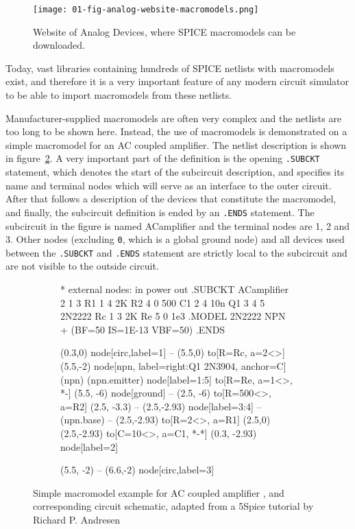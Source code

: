 \begin{figure}[h]
	\centering
	\texttt{[image: 01-fig-analog-website-macromodels.png]}
	\caption{Website of Analog Devices, where SPICE macromodels can be downloaded.}
	\label{fig:analog-macromodel-website}
\end{figure}

Today, vast libraries containing hundreds of SPICE netlists with macromodels exist, and therefore it is a very important feature of any modern circuit simulator to be able to import macromodels from these netlists.

Manufacturer-supplied macromodels are often very complex and the netlists are too long to be shown here. Instead, the use of macromodels is demonstrated on a simple macromodel for an AC coupled amplifier. The netlist description is shown in figure~\ref{fig:example_subcircuit}. A very important part of the definition is the opening \texttt{.SUBCKT} statement, which denotes the start of the subcircuit description, and specifies its name and terminal nodes which will serve as an interface to the outer circuit. After that follows a description of the devices that constitute the macromodel, and finally, the subcircuit definition is ended by an \texttt{.ENDS} statement. The subcircuit in the figure is named ACamplifier and the terminal nodes are 1, 2 and 3. Other nodes (excluding \texttt{0}, which is a global ground node) and all devices used between the \texttt{.SUBCKT} and \texttt{.ENDS} statement are strictly local to the subcircuit and are not visible to the outside circuit.

\begin{figure}[H]
	\centering	
	\begin{subfigure}{.43\textwidth}
	\begin{spicecode}
* external nodes:  in power out
.SUBCKT  ACamplifier 2 1 3
R1 1 4 2K
R2 4 0 500
C1 2 4 10n
Q1 3 4 5 2N2222
Rc 1 3 2K
Re 5 0 1e3
.MODEL 2N2222 NPN 
+ (BF=50 IS=1E-13 VBF=50)
.ENDS
	\end{spicecode}		
\end{subfigure}\hspace{5mm}
\begin{subfigure}{.5\textwidth}	
	\begin{circuitdev}
		(0.3,0) node[circ,label=1]{}
		-- (5.5,0)
		to[R=Rc, a=2<\kilo\ohm>] (5.5,-2)		
		node[npn, label={right:Q1 2N3904}, anchor=C](npn) {}		
		(npn.emitter) node[label=1:5]{}
		to[R=Re, a=1<\milli\ohm>, *-] (5.5, -6) node[ground]{}
		-- (2.5, -6)
		to[R=500<\ohm>, a=R2] (2.5, -3.3)
		-- (2.5,-2.93) node[label=3:4]{}
		-- (npn.base)
		-- (2.5,-2.93) 
		to[R=2<\kilo\ohm>, a=R1] (2.5,0)
		(2.5,-2.93) to[C=10<\nano\farad>, a=C1, *-*]
		(0.3, -2.93) node[label=2]{}
		
		(5.5, -2) -- (6.6,-2) node[circ,label=3]{}
	\end{circuitdev}
\end{subfigure}
\caption{Simple macromodel example for AC coupled amplifier \cite{5spice-subcircuit}, and corresponding circuit schematic, adapted from a 5Spice tutorial by Richard P. Andresen}
\label{fig:example_subcircuit}	
\end{figure}

